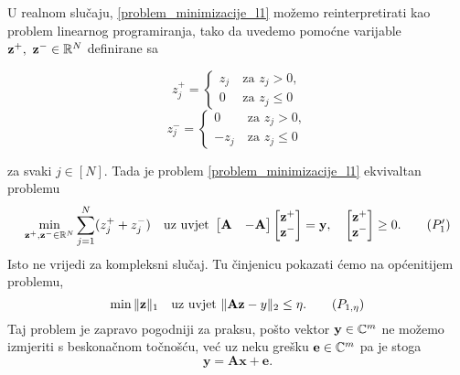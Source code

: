 \documentclass[a4paper,twoside,12pt]{memoir} %
\newcommand{\vect}[1]{\mathbf{#1}}
\renewcommand{\vec}{\vect}
\newcommand{\norm}[1]{\|{#1}\|}
\begin{document}
\indent
U realnom slu\v{c}aju, \eqref{problem_minimizacije_l1} mo\v{z}emo reinterpretirati kao problem linearnog programiranja, tako da uvedemo pomo\'cne varijable $\vec z^+,\ \vec z^- \in \R^N$ definirane sa
\begin{multicols}{2}
    \noindent
    \begin{equation*} 
        z_j^+ = 
        \begin{cases}
            z_j\ & \text{za } z_j > 0, \\
            0\ & \text{za } z_j \leq 0
        \end{cases}
    \end{equation*}
    \begin{equation*} 
        z_j^- = 
        \begin{cases}
            0\ & \text{za } z_j > 0, \\
            -z_j\ & \text{za } z_j \leq 0
        \end{cases}
    \end{equation*}
\end{multicols}
za svaki $j \in [N]$. Tada je problem \eqref{problem_minimizacije_l1} ekvivaltan problemu
\begin{equation}
    \min_{\vec z^+,\vec z^- \\ \in \R^N} \sum_{j=1}^{N}(z_j^+ + z_j^-) \quad \text{uz uvjet }
    \begin{bmatrix*}
        \vec A & -\vec A
    \end{bmatrix*}
    \begin{bmatrix*}
        \vec z^+ \\ \vec z^-
    \end{bmatrix*}
    = \vec y, \quad
    \begin{bmatrix*}
        \vec z^+ \\ \vec z^-
    \end{bmatrix*}
    \geq 0.\tag{$P_1'$}
\end{equation}
Isto ne vrijedi za kompleksni slu\v{c}aj. Tu \v{c}injenicu pokazati \'cemo na op\'{c}enitijem problemu,
\begin{equation}\label{problem_minimizacije_l1_kvadraticni}
    \min \norm{\vec z}_1 \quad \text{uz uvjet } \norm{\vec{Az}-y}_2 \leq \eta.\tag{$P_{1,\eta}$}
\end{equation}
Taj problem je zapravo pogodniji za praksu, po\v{s}to vektor $\vec y \in \C^m$ ne mo\v{z}emo izmjeriti s beskona\v{c}nom to\v{c}no\v{s}\'cu, ve\'c uz neku gre\v{s}ku $\vec e \in \C^m$ pa je stoga
\begin{equation*}
    \vec y = \vec{Ax} + \vec e. 
\end{equation*}
\end{document}
